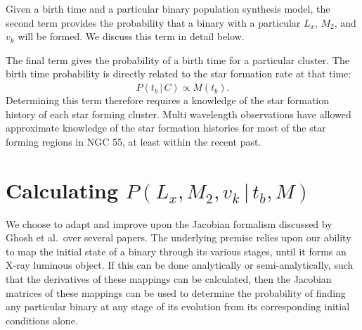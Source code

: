 \documentclass[12pt, preprint]{aastex}
\newcommand{\given}{\,|\,}
\begin{document}
Given a birth time and a particular binary population synthesis model, the second term provides the probability that a binary with a particular $L_x$, $M_2$, and $v_k$ will be formed. We discuss this term in detail below.

The final term gives the probability of a birth time for a particular cluster. The birth time probability is directly related to the star formation rate at that time:
\begin{equation}
P(t_b \given C) \propto \dot{M}(t_b).
\end{equation} 
Determining this term therefore requires a knowledge of the star formation history of each star forming cluster. Multi wavelength observations have allowed approximate knowledge of the star formation histories for most of the star forming regions in NGC 55, at least within the recent past.

 
 
\section{Calculating $P(L_x, M_2, v_k \given t_b, M)$}

We choose to adapt and improve upon the Jacobian formalism discussed by Ghosh et al.\ over several papers. The underlying premise relies upon our ability to map the initial state of a binary through its various stages, until it forms an X-ray luminous object. If this can be done analytically or semi-analytically, such that the derivatives of these mappings can be calculated, then the Jacobian matrices of these mappings can be used to determine the probability of finding any particular binary at any stage of its evolution from its corresponding initial conditions alone.
\end{document}
